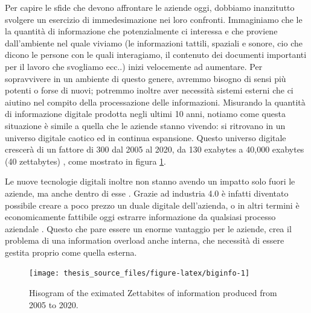 \documentclass[]{book}
\begin{document}
Per capire le sfide che devono affrontare le aziende oggi, dobbiamo
inanzitutto svolgere un esercizio di immedesimazione nei loro confronti.
Immaginiamo che le la quantità di informazione che potenzialmente ci
interessa e che proviene dall'ambiente nel quale viviamo (le
informazioni tattili, spaziali e sonore, cio che dicono le persone con
le quali interagiamo, il contenuto dei documenti importanti per il
lavoro che svogliamo ecc..) inizi velocemente ad aumentare. Per
sopravvivere in un ambiente di questo genere, avremmo bisogno di sensi
più potenti o forse di nuovi; potremmo inoltre aver necessità sistemi
esterni che ci aiutino nel compito della processazione delle
informazioni. Misurando la quantità di informazione digitale prodotta
negli ultimi 10 anni, notiamo come questa situazione è simile a quella
che le aziende stanno vivendo: si ritrovano in un universo digitale
caotico ed in continua espansione. Questo universo digitale crescerà di
un fattore di 300 dal 2005 al 2020, da 130 exabytes a 40,000 exabytes
(40 zettabytes) \citep{gantz2012digital}, come mostrato in figura
\ref{fig:biginfo}.

Le nuove tecnologie digitali inoltre non stanno avendo un impatto solo
fuori le aziende, ma anche dentro di esse
\citep{lasi2014industry, brettel2014virtualization, russmann2015industry}.
Grazie ad industria 4.0 è infatti diventato possibile creare a poco
prezzo un duale digitale dell'azienda, o in altri termini è
economicamente fattibile oggi estrarre informazione da qualsiasi
processo aziendale \citep{davies2015industry}. Questo che pare essere un
enorme vantaggio per le aziende, crea il problema di una information
overload anche interna, che necessità di essere gestita proprio come
quella esterna.

\begin{figure}

{\centering \texttt{[image: thesis\_source\_files/figure-latex/biginfo-1]} 

}

\caption{Hisogram of the eximated Zettabites of information produced from 2005 to 2020.}\label{fig:biginfo}
\end{figure}
\end{document}
